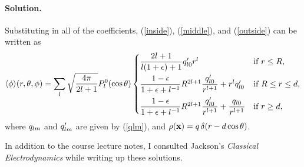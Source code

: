 \documentclass[11pt]{article}
\newcommand{\refeq}[1]{(\ref{#1})}
\newcommand{\beq}{\begin{equation*}}
\newcommand{\eeq}{\end{equation*}}
\newcommand{\beqn}{\begin{equation}}
\newcommand{\eeqn}{\end{equation}}
\newenvironment{solution}
{
    \paragraph{Solution.}
    \ignorespaces
}
{
    \bigskip
}
\begin{document}
\begin{solution}
	Substituting in all of the coefficients, \refeq{inside}, \refeq{middle}, and \refeq{outside} can be written as
	\beqn \label{sol1}
		\evphi\!\rtp = \sum_{l} \sqrt{\frac{4\pi}{2l+1}} \Ploct \begin{cases}
			\dfrac{2l + 1}{l (1 + \eps) + 1} \qplo r^l & \tif r \leq R, \\[2ex]
			\dfrac{1 - \eps}{1 + \eps + l^{-1}} R^{2l+1} \dfrac{\qplo}{r^{l+1}} + r^l \qplo & \tif R \leq r \leq d, \\[2ex]
			\dfrac{1 - \eps}{1 + \eps + l^{-1}} R^{2l+1} \dfrac{\qplo}{r^{l+1}} + \dfrac{\qlo}{r^{l+1}} & \tif r \geq d,
		\end{cases}
	\eeqn
	where $q_{l m}$ and $q'_{l m}$ are given by \refeq{qlm}, and $\rho(\vb{x}) = q \,\delta(r - d\cos\theta)$.
\end{solution}


\clearpage




\vfill
In addition to the course lecture notes, I consulted Jackson's \emph{Classical Electrodynamics} while writing up these solutions.
\end{document}
